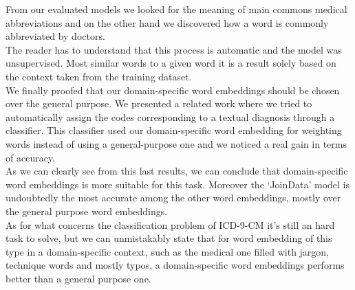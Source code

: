 From our evaluated models we looked for the meaning of main commons medical abbreviations and on the other hand we discovered how a word is commonly abbreviated by doctors.\\ 
The reader has to understand that this process is automatic and the model was unsupervised. Most similar words to a given word it is a result solely based on the context taken from the training dataset.\\
We finally proofed that our domain-specific word embeddings should be chosen over the general purpose. We presented a related work where we tried to automatically assign the codes corresponding to a textual diagnosis through a classifier. This classifier used our domain-specific word embedding for weighting words instead of using a general-purpose one and we noticed a real gain in terms of accuracy.\\
As we can clearly see from this last results, we can conclude that domain-specific word embeddings is more suitable for this task. Moreover the \enquote*{JoinData} model is undoubtedly the most accurate among the other word embeddings, mostly over the general purpose word embeddings. \\
As for what concerns the classification problem of ICD-9-CM it's still an hard task to solve, but we can unmistakably state that for word embedding of this type in a domain-specific context, such as the medical one filled with jargon, technique words and mostly typos, a domain-specific word embeddings performs better than a general purpose one.